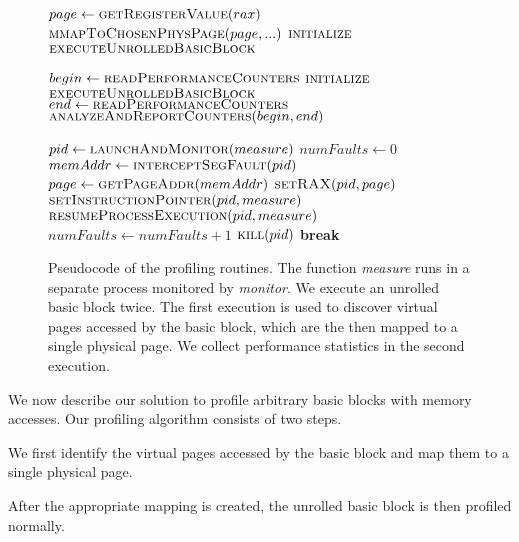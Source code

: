 \begin{figure}
\begin{algorithmic}

    \State $page \gets \Call{getRegisterValue}{rax}$
    \State $\Call{mmapToChosenPhysPage}{page, ...}$
    \State $\Call{initialize}{}$
    \State $\Call{executeUnrolledBasicBlock}{}$
    
    
    \State $begin \gets \Call{readPerformanceCounters}{}$
    \State $\Call{initialize}{}$
    \State $\Call{executeUnrolledBasicBlock}{}$
    \State $end \gets \Call{readPerformanceCounters}{}$
    \State $\Call{analyzeAndReportCounters}{begin, end}$
\EndFunction

    \State $pid \gets \Call{launchAndMonitor}{measure}$
    \State $numFaults \gets 0$
        \State $memAddr \gets \Call{interceptSegFault}{pid}$
            \State $page \gets \Call{getPageAddr}{memAddr}$
            \State $\Call{setRAX}{pid, page}$
            \State $\Call{setInstructionPointer}{pid, measure}$
            \State $\Call{resumeProcessExecution}{pid, measure}$
            \State $numFaults \gets numFaults + 1$
        \EndIf
            \State $\Call{kill}{pid}$
            \State \textbf{break}
        \EndIf
    \EndWhile
\EndFunction

\end{algorithmic}

\caption{Pseudocode of the profiling routines. 
The function \textit{measure} runs in a separate process monitored by
\textit{monitor}.
We execute an unrolled basic block twice.
The first execution is used to discover virtual pages accessed
by the basic block, which are the then mapped to a single physical page.
We collect performance statistics in the second execution.}
\label{fig:code}
\end{figure}

We now describe our solution to profile arbitrary basic blocks with memory accesses.
Our profiling algorithm consists of two steps.
\begin{enumerate*}
\item We first identify the virtual pages accessed by
the basic block 
and map them to a single physical page.
\item After the appropriate mapping is created,
the unrolled basic block is then profiled normally.
\end{enumerate*}

